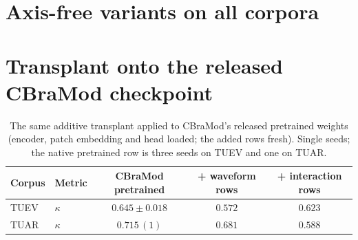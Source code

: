 \section{Axis-free variants on all corpora}
\label{app:variants}

\begin{table}[h]
\centering
\small
\caption{Every axis-free variant on every corpus, single seeds; the
tri-axial duplex model (three seeds) for reference. ``all'' = fold +
strength + $d{=}192$.}
\label{tab:variants-all}
\end{table}

\section{Transplant onto the released CBraMod checkpoint}
\label{app:transplant-pre}

\begin{table}[h]
\centering
\small
\caption{The same additive transplant applied to CBraMod's released
pretrained weights (encoder, patch embedding and head loaded; the added
rows fresh). Single seeds; the native pretrained row is three seeds on
TUEV and one on TUAR.}
\label{tab:transplant-pre}
\begin{tabular}{llccc}
\toprule
Corpus & Metric & CBraMod pretrained & + waveform rows & + interaction rows \\
\midrule
TUEV & $\kappa$ & $\mathbf{0.645 \pm 0.018}$ & $0.572$ & $0.623$ \\
TUAR & $\kappa$ & $\mathbf{0.715}\,(1)$ & $0.681$ & $0.588$ \\
\bottomrule
\end{tabular}
\end{table}

